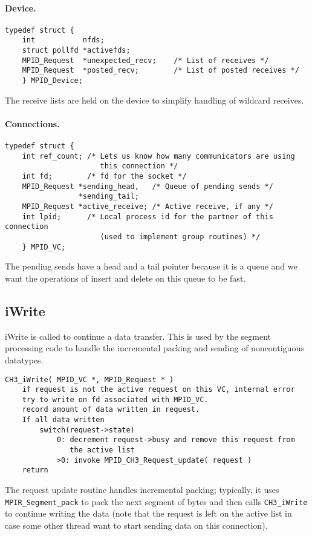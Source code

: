 \documentclass{article}
\def\code{\begingroup\makeustext\eatcode}
\def\eatcode#1{\texttt{#1}\endgroup}
\begin{document}
\paragraph{Device.}
\begin{verbatim}
typedef struct {
    int           nfds;
    struct pollfd *activefds;
    MPID_Request  *unexpected_recv;    /* List of receives */
    MPID_Request  *posted_recv;        /* List of posted receives */
    } MPID_Device;
\end{verbatim}
The receive lists are held on the device to simplify handling of wildcard
receives.  

\paragraph{Connections.}

\begin{verbatim}
typedef struct { 
    int ref_count; /* Lets us know how many communicators are using
                      this connection */
    int fd;        /* fd for the socket */
    MPID_Request *sending_head,   /* Queue of pending sends */
                 *sending_tail;
    MPID_Request *active_receive; /* Active receive, if any */
    int lpid;      /* Local process id for the partner of this connection
                      (used to implement group routines) */
    } MPID_VC;
\end{verbatim}
The pending sends have a head and a tail pointer because it is a queue and we
want the operations of insert and delete on this queue to be fast.

\subsection{iWrite}
iWrite is called to continue a data transfer.  This is used by the
segment processing code to handle the incremental packing and sending
of noncontiguous datatypes.

\begin{verbatim}
CH3_iWrite( MPID_VC *, MPID_Request * )
    if request is not the active request on this VC, internal error
    try to write on fd associated with MPID_VC.  
    record amount of data written in request.
    If all data written
        switch(request->state)
            0: decrement request->busy and remove this request from
               the active list
            >0: invoke MPID_CH3_Request_update( request )
    return
\end{verbatim}
The request update routine handles incremental packing; typically, it
uses \code{MPIR_Segment_pack} to pack the next segment of bytes and
then calls \code{CH3_iWrite} to continue writing the data (note that
the request is left on the active list in case some other thread want
to start sending data on this connection).
\end{document}
